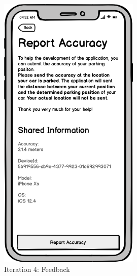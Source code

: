 \begin{figure}[H]
\begin{minipage}[b]{0.45\textwidth}
    \includegraphics[width=0.6\textwidth]{images/UI/Iteration4-Feedback.png}
    \caption{Iteration 4: Feedback}
    \label{fig:i4-feedback}
  \end{minipage}
\end{figure}

